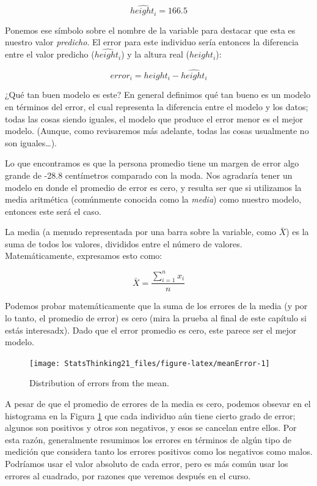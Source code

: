 \documentclass[
  12pt,
]{book}
\begin{document}
\[
\hat{height_i} = 166.5
\]

Ponemos ese símbolo sobre el nombre de la variable para destacar que esta es nuestro valor \emph{predicho}. El error para este individuo sería entonces la diferencia entre el valor predicho (\(\hat{height_i}\)) y la altura real (\(height_i\)):

\[
error_i = height_i - \hat{height_i}
\]

¿Qué tan buen modelo es este? En general definimos qué tan bueno es un modelo en términos del error, el cual representa la diferencia entre el modelo y los datos; todas las cosas siendo iguales, el modelo que produce el error menor es el mejor modelo. (Aunque, como revisaremos más adelante, todas las cosas usualmente no son iguales\ldots).

Lo que encontramos es que la persona promedio tiene un margen de error algo grande de -28.8 centímetros comparado con la moda. Nos agradaría tener un modelo en donde el promedio de error es cero, y resulta ser que si utilizamos la media aritmética (comúnmente conocida como la \emph{media}) como nuestro modelo, entonces este será el caso.

La media (a menudo representada por una barra sobre la variable, como \(\bar{X}\)) es la suma de todos los valores, divididos entre el número de valores. Matemáticamente, expresamos esto como:

\[
\bar{X} = \frac{\sum_{i=1}^{n}x_i}{n}
\]

Podemos probar matemáticamente que la suma de los errores de la media (y por lo tanto, el promedio de error) es cero (mira la prueba al final de este capítulo si estás interesadx). Dado que el error promedio es cero, este parece ser el mejor modelo.

\begin{figure}
\texttt{[image: StatsThinking21\_files/figure-latex/meanError-1]} \caption{Distribution of errors from the mean.}\label{fig:meanError}
\end{figure}

A pesar de que el promedio de errores de la media es cero, podemos obsevar en el histograma en la Figura \ref{fig:meanError} que cada individuo aún tiene cierto grado de error; algunos son positivos y otros son negativos, y esos se cancelan entre ellos. Por esta razón, generalmente resumimos los errores en términos de algún tipo de medición que considera tanto los errores positivos como los negativos como malos. Podríamos usar el valor absoluto de cada error, pero es más común usar los errores al cuadrado, por razones que veremos después en el curso.
\end{document}
